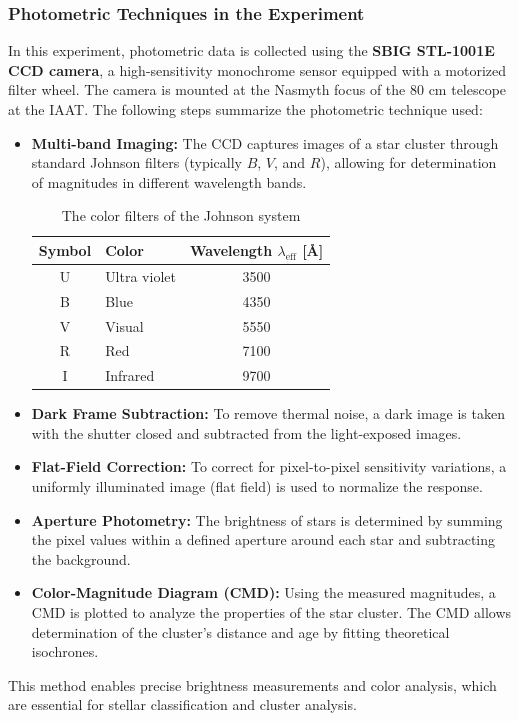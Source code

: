 \documentclass[12pt,a4paper]{article}
\begin{document}
  \subsubsection*{Photometric Techniques in the Experiment}
  In this experiment, photometric data is collected using the \textbf{SBIG STL-1001E CCD camera}, a high-sensitivity monochrome sensor equipped with a motorized filter wheel. The camera is mounted at the Nasmyth focus of the 80 cm telescope at the IAAT.
  The following steps summarize the photometric technique used:
  \begin{itemize}
    \item \textbf{Multi-band Imaging:} The CCD captures images of a star cluster through standard Johnson filters (typically $B$, $V$, and $R$), allowing for determination of magnitudes in different wavelength bands.
    \begin{table}[h!]
      \centering
      \caption{The color filters of the Johnson system}
      \begin{tabular}{|c|l|c|}
      \hline
      \textbf{Symbol} & \textbf{Color} & \textbf{Wavelength $\lambda_\mathrm{eff}$ [\AA]} \\
      \hline
      U & Ultra violet & 3500 \\
      B & Blue         & 4350 \\
      V & Visual       & 5550 \\
      R & Red          & 7100 \\
      I & Infrared     & 9700 \\
      \hline
      \end{tabular}
      \end{table}
      
    \item \textbf{Dark Frame Subtraction:} To remove thermal noise, a dark image is taken with the shutter closed and subtracted from the light-exposed images.
    \item \textbf{Flat-Field Correction:} To correct for pixel-to-pixel sensitivity variations, a uniformly illuminated image (flat field) is used to normalize the response.
    \item \textbf{Aperture Photometry:} The brightness of stars is determined by summing the pixel values within a defined aperture around each star and subtracting the background.
    \item \textbf{Color-Magnitude Diagram (CMD):} Using the measured magnitudes, a CMD is plotted to analyze the properties of the star cluster. The CMD allows determination of the cluster’s distance and age by fitting theoretical isochrones.
  \end{itemize}
  This method enables precise brightness measurements and color analysis, which are essential for stellar classification and cluster analysis.
\end{document}
